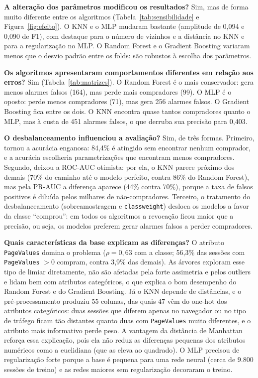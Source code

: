 \documentclass[11pt,a4paper]{article}
\DeclareRobustCommand{\atr}[1]{{\renewcommand{\_}{\textunderscore\allowbreak}\texttt{#1}}}
\begin{document}
\textbf{A alteração dos parâmetros modificou os resultados?} Sim, mas de forma muito diferente entre os algoritmos
(Tabela~\ref{tab:sensibilidade} e Figura~\ref{fig:efeito}). O KNN e o MLP mudaram bastante (amplitude de 0,094 e 0,090
de F1), com destaque para o número de vizinhos e a distância no KNN e para a regularização no MLP. O Random Forest e o
Gradient Boosting variaram menos que o desvio padrão entre os folds: são robustos à escolha dos parâmetros.

\textbf{Os algoritmos apresentaram comportamentos diferentes em relação aos erros?} Sim (Tabela~\ref{tab:matrizes}). O
Random Forest é o mais conservador: gera menos alarmes falsos (164), mas perde mais compradores (99). O MLP é o oposto:
perde menos compradores (71), mas gera 256 alarmes falsos. O Gradient Boosting fica entre os dois. O KNN encontra quase
tantos compradores quanto o MLP, mas à custa de 451 alarmes falsos, o que derruba sua precisão para 0,403.

\textbf{O desbalanceamento influenciou a avaliação?} Sim, de três formas. Primeiro, tornou a acurácia enganosa: 84,4\%
é atingido sem encontrar nenhum comprador, e a acurácia escolheria parametrizações que encontram menos compradores.
Segundo, deixou a ROC-AUC otimista: por ela, o KNN parece próximo dos demais (70\% do caminho até o modelo perfeito,
contra 86\% do Random Forest), mas pela PR-AUC a diferença aparece (44\% contra 70\%), porque a taxa de falsos positivos
é diluída pelos milhares de não-compradores. Terceiro,
o tratamento do desbalanceamento (sobreamostragem e \atr{class\_weight}) desloca os modelos a favor da classe
``comprou'': em todos os algoritmos a revocação ficou maior que a precisão, ou seja, os modelos preferem gerar alarmes
falsos a perder compradores.

\textbf{Quais características da base explicam as diferenças?} O atributo \atr{PageValues} domina o problema ($\rho =
0{,}63$ com a classe; 56,3\% das sessões com \atr{PageValues} $> 0$ compram, contra 3,9\% das demais). As árvores
exploram esse tipo de limiar diretamente, não são afetadas pela forte assimetria e pelos outliers e lidam bem com
atributos categóricos, o que explica o bom desempenho do Random Forest e do Gradient Boosting. Já o KNN depende de
distâncias, e o pré-processamento produziu 55 colunas, das quais 47 vêm do one-hot dos atributos categóricos: duas
sessões que diferem apenas no navegador ou no tipo de tráfego ficam tão distantes quanto duas com \atr{PageValues}
muito diferentes, e o atributo mais informativo perde peso. A vantagem da distância de Manhattan reforça essa
explicação, pois ela não reduz as diferenças pequenas dos atributos numéricos como a euclidiana (que as eleva ao
quadrado). O MLP precisou de regularização forte porque a base é pequena para uma rede neural (cerca de 9.800 sessões
de treino) e as redes maiores sem regularização decoraram o treino.
\end{document}
